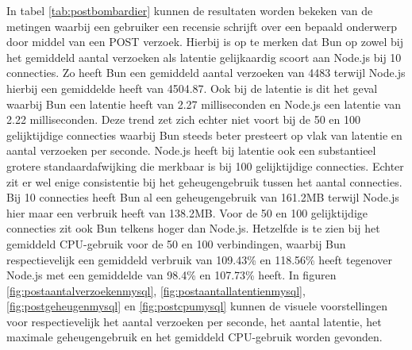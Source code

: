 In tabel \ref{tab:postbombardier} kunnen de resultaten worden bekeken van de metingen waarbij 
een gebruiker een recensie schrijft over een bepaald onderwerp door middel van een POST verzoek.
Hierbij is op te merken dat Bun op zowel bij het gemiddeld aantal verzoeken als latentie gelijkaardig scoort aan Node.js bij 10 connecties. Zo heeft Bun
een gemiddeld aantal verzoeken van 4483 terwijl Node.js hierbij een gemiddelde heeft van 4504.87. 
Ook bij de latentie is dit het geval waarbij Bun een latentie heeft van 2.27 milliseconden en Node.js een latentie van 2.22 milliseconden.
Deze trend zet zich echter niet voort bij de 50 en 100 gelijktijdige connecties waarbij Bun steeds beter presteert op vlak van latentie en aantal verzoeken per seconde.
Node.js heeft bij latentie ook een substantieel grotere standaardafwijking die merkbaar is bij 100 gelijktijdige connecties.
Echter zit er wel enige consistentie bij het geheugengebruik tussen het aantal connecties.
Bij 10 connecties heeft Bun al een geheugengebruik van 161.2MB terwijl Node.js hier maar een verbruik heeft van 138.2MB.
Voor de 50 en 100 gelijktijdige connecties zit ook Bun telkens hoger dan Node.js.
Hetzelfde is te zien bij het gemiddeld CPU-gebruik voor de 50 en 100 verbindingen, waarbij Bun respectievelijk
een gemiddeld verbruik van 109.43\% en 118.56\% heeft tegenover Node.js met een gemiddelde van 98.4\% en 107.73\% heeft.
In figuren \ref{fig:postaantalverzoekenmysql}, \ref{fig:postaantallatentienmysql}, \ref{fig:postgeheugenmysql} en \ref{fig:postcpumysql} kunnen de visuele voorstellingen 
voor respectievelijk het aantal verzoeken per seconde, het aantal latentie, het maximale geheugengebruik en het gemiddeld CPU-gebruik worden gevonden.
